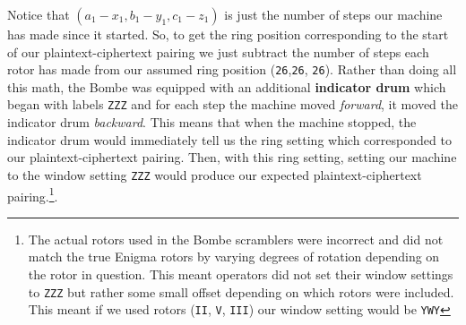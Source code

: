 Notice that $(a_1-x_1, b_1-y_1, c_1-z_1)$ is just the number of steps our machine has made since it started. So, to get the ring position corresponding to the start of our plaintext-ciphertext pairing we just subtract the number of steps each rotor has made from our assumed ring position (\texttt{26},\texttt{26}, \texttt{26}). Rather than doing all this math, the Bombe was equipped with an additional {\bf{indicator drum}} which began with labels \texttt{ZZZ} and for each step the machine moved \emph{forward}, it moved the indicator drum \emph{backward}. This means that when the machine stopped, the indicator drum would immediately tell us the ring setting which corresponded to our plaintext-ciphertext pairing. Then, with this ring setting, setting our machine to the window setting \texttt{ZZZ} would produce our expected plaintext-ciphertext pairing.\footnote{The actual rotors used in the Bombe scramblers were incorrect and did not match the true Enigma rotors by varying degrees of rotation depending on the rotor in question. This meant operators did not set their window settings to \texttt{ZZZ} but rather some small offset depending on which rotors were included. This meant if we used rotors (\texttt{II}, \texttt{V}, \texttt{III}) our window setting would be \texttt{YWY}}.

